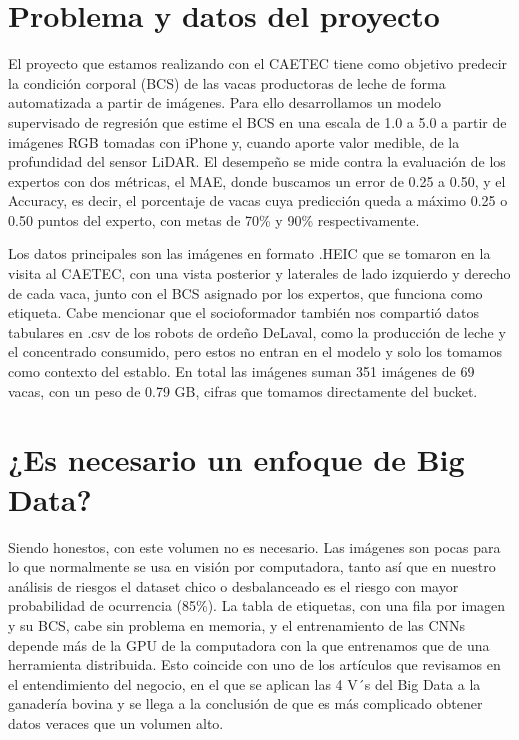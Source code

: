 \documentclass[11pt,letterpaper,DIV=12]{scrartcl}
\begin{document}


\section{Problema y datos del proyecto}

El proyecto que estamos realizando con el CAETEC tiene como objetivo predecir la condición corporal (BCS) de las vacas productoras de leche de forma automatizada a partir de imágenes. Para ello desarrollamos un modelo supervisado de regresión que estime el BCS en una escala de 1.0 a 5.0 a partir de imágenes RGB tomadas con iPhone y, cuando aporte valor medible, de la profundidad del sensor LiDAR. El desempeño se mide contra la evaluación de los expertos con dos métricas, el MAE, donde buscamos un error de 0.25 a 0.50, y el Accuracy, es decir, el porcentaje de vacas cuya predicción queda a máximo 0.25 o 0.50 puntos del experto, con metas de 70\% y 90\% respectivamente.

Los datos principales son las imágenes en formato .HEIC que se tomaron en la visita al CAETEC, con una vista posterior y laterales de lado izquierdo y derecho de cada vaca, junto con el BCS asignado por los expertos, que funciona como etiqueta. Cabe mencionar que el socioformador también nos compartió datos tabulares en .csv de los robots de ordeño DeLaval, como la producción de leche y el concentrado consumido, pero estos no entran en el modelo y solo los tomamos como contexto del establo. En total las imágenes suman 351 imágenes de 69 vacas, con un peso de 0.79 GB, cifras que tomamos directamente del bucket.

\section{¿Es necesario un enfoque de Big Data?}

Siendo honestos, con este volumen no es necesario. Las imágenes son pocas para lo que normalmente se usa en visión por computadora, tanto así que en nuestro análisis de riesgos el dataset chico o desbalanceado es el riesgo con mayor probabilidad de ocurrencia (85\%). La tabla de etiquetas, con una fila por imagen y su BCS, cabe sin problema en memoria, y el entrenamiento de las CNNs depende más de la GPU de la computadora con la que entrenamos que de una herramienta distribuida. Esto coincide con uno de los artículos que revisamos en el entendimiento del negocio, en el que se aplican las 4 V´s del Big Data a la ganadería bovina y se llega a la conclusión de que es más complicado obtener datos veraces que un volumen alto.
\end{document}
